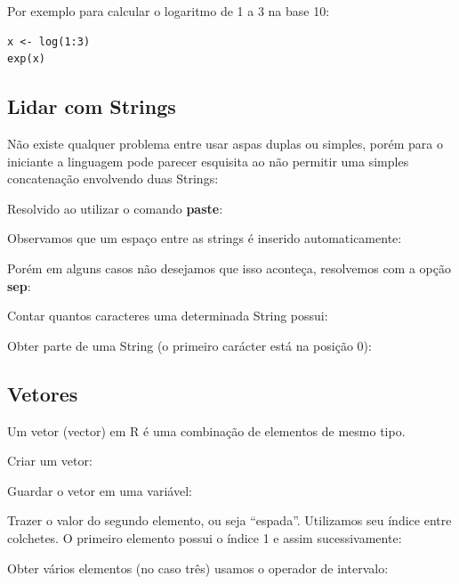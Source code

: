 \documentclass[a4paper,11pt]{article}
\begin{document}
Por exemplo para calcular o logaritmo de 1 a 3 na base 10:
\begin{lstlisting}
x <- log(1:3)
exp(x)
\end{lstlisting}

\subsection{Lidar com Strings}
Não existe qualquer problema entre usar aspas duplas ou simples, porém para o iniciante a linguagem pode parecer esquisita ao não permitir uma simples concatenação envolvendo duas Strings: \\

Resolvido ao utilizar o comando \textbf{paste}: \\

Observamos que um espaço entre as strings é inserido automaticamente: \\

Porém em alguns casos não desejamos que isso aconteça, resolvemos com a opção \textbf{sep}: \\

Contar quantos caracteres uma determinada String possui: \\

Obter parte de uma String (o primeiro carácter está na posição 0): \\

\subsection{Vetores}
Um vetor (vector) em R é uma combinação de elementos de mesmo tipo.

Criar um vetor: \\

Guardar o vetor em uma variável: \\

Trazer o valor do segundo elemento, ou seja ``espada''. Utilizamos seu índice entre colchetes. O primeiro elemento possui o índice 1 e assim sucessivamente: \\

Obter vários elementos (no caso três) usamos o operador de intervalo: \\
\end{document}
